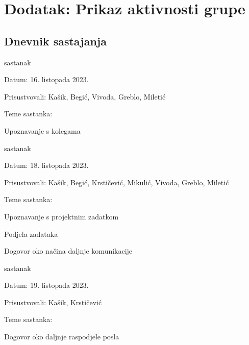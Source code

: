 \chapter*{Dodatak: Prikaz aktivnosti grupe}
		
		\section*{Dnevnik sastajanja}
		
		
		\begin{packed_enum}
			\item  sastanak
			
			\item[] \begin{packed_item}
				\item Datum: 16. listopada 2023.
				\item Prisustvovali: Kašik, Begić, Vivoda, Greblo, Miletić
				\item Teme sastanka:
				\begin{packed_item}
					\item  Upoznavanje s kolegama
				\end{packed_item}
			\end{packed_item}
			
			\item  sastanak
			\item[] \begin{packed_item}
				\item Datum: 18. listopada 2023.
				\item Prisustvovali: Kašik, Begić, Krstičević, Mikulić, Vivoda, Greblo, Miletić
				\item Teme sastanka:
				\begin{packed_item}
					\item  Upoznavanje s projektnim zadatkom
					\item  Podjela zadataka
                    \item  Dogovor oko načina daljnje komunikacije
				\end{packed_item}
			\end{packed_item}

            \item  sastanak
			\item[] \begin{packed_item}
				\item Datum: 19. listopada 2023.
				\item Prisustvovali: Kašik, Krstičević
				\item Teme sastanka:
				\begin{packed_item}
					\item  Dogovor oko daljnje raspodjele posla
				\end{packed_item}
			\end{packed_item}


\end{packed_enum}
